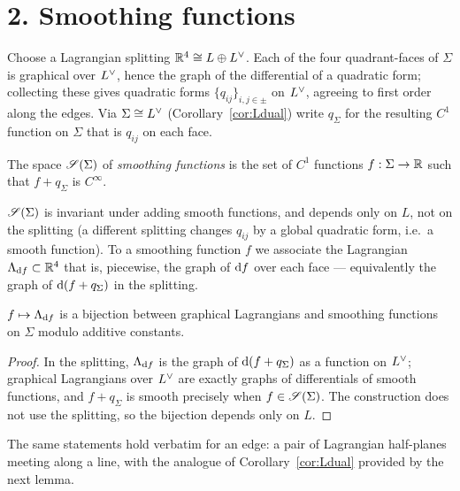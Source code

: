 \section*{2. Smoothing functions}

Choose a Lagrangian splitting $\mathbb{R}^4\cong L\oplus L^{\vee}$. Each of the four
quadrant-faces of $\Sigma$ is graphical over $L^{\vee}$, hence the graph of the
differential of a quadratic form; collecting these gives quadratic forms
$\{q_{ij}\}_{i,j\in\pm}$ on $L^{\vee}$, agreeing to first order along the edges.
Via $\Sigma\cong L^{\vee}$ (Corollary~\ref{cor:Ldual}) write $q_\Sigma$ for the
resulting $C^1$ function on $\Sigma$ that is $q_{ij}$ on each face.

\begin{qeightdefinition}\label{def:smoothing}
The space $\mathscr S(\Sigma)$ of \emph{smoothing functions} is the set of $C^1$
functions $f:\Sigma\to\mathbb{R}$ such that $f+q_\Sigma$ is $C^\infty$.
\end{qeightdefinition}

$\mathscr S(\Sigma)$ is invariant under adding smooth functions, and depends only on
$L$, not on the splitting (a different splitting changes $q_{ij}$ by a global
quadratic form, i.e.\ a smooth function). To a smoothing function $f$ we
associate the Lagrangian $\Lambda_{\mathrm d f}\subset\mathbb{R}^4$ that is, piecewise, the graph
of $\mathrm d f$ over each face — equivalently the graph of $\mathrm d(f+q_\Sigma)$ in the
splitting.

\begin{qeightlemma}\label{lem:bijection}
$f\mapsto \Lambda_{\mathrm d f}$ is a bijection between graphical Lagrangians and
smoothing functions on $\Sigma$ modulo additive constants.
\end{qeightlemma}

\begin{proof}
In the splitting, $\Lambda_{\mathrm d f}$ is the graph of $\mathrm d(f+q_\Sigma)$ as a function
on $L^{\vee}$; graphical Lagrangians over $L^{\vee}$ are exactly graphs of
differentials of smooth functions, and $f+q_\Sigma$ is smooth precisely when
$f\in\mathscr S(\Sigma)$. The construction does not use the splitting, so the bijection
depends only on $L$.
\end{proof}

\noindent The same statements hold verbatim for an edge: a pair of Lagrangian
half-planes meeting along a line, with the analogue of
Corollary~\ref{cor:Ldual} provided by the next lemma.

